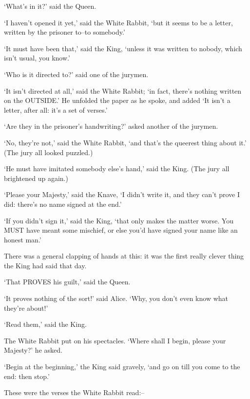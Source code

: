 \documentclass[12pt]{book}
\begin{document}
  `What's in it?' said the Queen.

  `I haven't opened it yet,' said the White Rabbit, `but it seems
to be a letter, written by the prisoner to--to somebody.'

  `It must have been that,' said the King, `unless it was
written to nobody, which isn't usual, you know.'

  `Who is it directed to?' said one of the jurymen.

  `It isn't directed at all,' said the White Rabbit; `in fact,
there's nothing written on the OUTSIDE.'  He unfolded the paper
as he spoke, and added `It isn't a letter, after all:  it's a set
of verses.'

  `Are they in the prisoner's handwriting?' asked another of
the jurymen.

  `No, they're not,' said the White Rabbit, `and that's the
queerest thing about it.'  (The jury all looked puzzled.)

  `He must have imitated somebody else's hand,' said the King.
(The jury all brightened up again.)

  `Please your Majesty,' said the Knave, `I didn't write it, and
they can't prove I did:  there's no name signed at the end.'

  `If you didn't sign it,' said the King, `that only makes the
matter worse.  You MUST have meant some mischief, or else you'd
have signed your name like an honest man.'

  There was a general clapping of hands at this:  it was the
first really clever thing the King had said that day.

  `That PROVES his guilt,' said the Queen.

  `It proves nothing of the sort!' said Alice.  `Why, you don't
even know what they're about!'

  `Read them,' said the King.

  The White Rabbit put on his spectacles.  `Where shall I begin,
please your Majesty?' he asked.

  `Begin at the beginning,' the King said gravely, `and go on
till you come to the end:  then stop.'

  These were the verses the White Rabbit read:--
\end{document}
